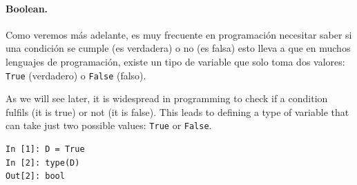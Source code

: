 \begin{paracol}{2}
\paragraph{Boolean.} Como veremos más adelante, es muy frecuente en programación necesitar saber si una condición se cumple (es verdadera) o no (es falsa) esto lleva a que en muchos lenguajes de programación, existe un tipo de variable que solo toma dos valores: \texttt{True} (verdadero)  o \texttt{False} (falso).

\switchcolumn
As we will see later, it is widespread in programming to check if a condition fulfils (it is true) or not (it is false). This leads to defining a type of variable that can take just two possible values:  \texttt{True} or \texttt{False}. 
\end{paracol}
\begin{center}
    \begin{minipage}{0.2\textwidth}
\begin{verbatim}
In [1]: D = True
In [2]: type(D)
Out[2]: bool
\end{verbatim}
\end{minipage}\end{center}

